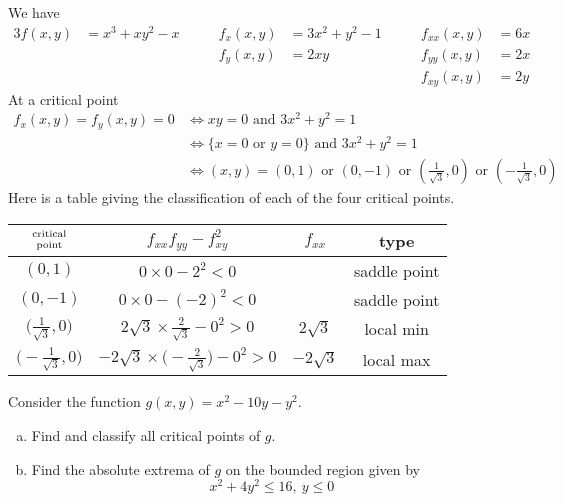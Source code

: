 \begin{solution}
We have
\begin{alignat*}{3}
f(x,y)&=x^3+xy^2-x\qquad &
f_x(x,y)&=3x^2+y^2-1\qquad &
f_{xx}(x,y)&=6x \\
 & & f_y(x,y)&=2xy &
f_{yy}(x,y)&=2x \\
 & & & & f_{xy}(x,y)&=2y
\end{alignat*}
At a critical point
\begin{align*}
f_x(x,y)=f_y(x,y)=0
&\iff xy=0\text{ and }3x^2+y^2=1 \\
&\iff \{x=0\text{ or }y=0\}\text{ and }3x^2+y^2=1 \\
&\iff (x,y)=(0,1)\text{ or }(0,-1)\text{ or }\left(\frac{1}{\sqrt{3}},0\right)
\text{ or }\left(-\frac{1}{\sqrt{3}},0\right)
\end{align*}
Here is a table giving the classification of each of the four critical
points.
\begin{center}
\renewcommand{\arraystretch}{1.3}
     \begin{tabular}{|c|c|c|c|}
     \hline
    $\Atop{\text{critical}}{\text{point}}$  & $f_{xx}f_{yy}-f_{xy}^2$ & 
                                                          $f_{xx}$ & type \\    
    \hline
     $(0,1)$   & $0\times 0-2^2<0$      &    & saddle point \\ \hline
     $(0,-1)$  & $0\times 0-(-2)^2<0$   &    & saddle point \\  \hline
     $\big(\frac{1}{\sqrt{3}},0\big)$  &
           $2\sqrt{3}\times\frac{2}{\sqrt{3}}-0^2>0$ & $2\sqrt{3}$ & 
                                                     local min\\  \hline
     $\big(-\frac{1}{\sqrt{3}},0\big)$ & 
          $-2\sqrt{3}\times \big(-\frac{2}{\sqrt{3}}\big)-0^2>0$ &                                         $-2\sqrt{3}$ & local max \\ \hline
     \end{tabular}
\renewcommand{\arraystretch}{1.0}
\end{center}
\end{solution}

\begin{question} [M200 2001A] %
Consider the function 
$
g(x,y)=x^2-10y-y^2
.$ 
\begin{enumerate}[(a)]
\item
Find and classify  all critical points of $g$.

\item 
Find the absolute extrema of $g$ on the bounded region given by
\begin{equation*}
x^2+4y^2\le 16,\ y\le 0
\end{equation*}
\end{enumerate}
\end{question}

